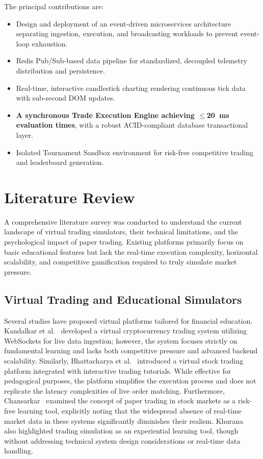 \documentclass[conference]{IEEEtran}
\begin{document}
The principal contributions are:
\begin{itemize}
    \item Design and deployment of an event-driven microservices architecture separating ingestion, execution, and broadcasting workloads to prevent event-loop exhaustion.
    \item Redis Pub/Sub-based data pipeline for standardized, decoupled telemetry distribution and persistence.
    \item Real-time, interactive candlestick charting rendering continuous tick data with sub-second DOM updates.
    \item \textbf{A synchronous Trade Execution Engine achieving $\leq$20~ms evaluation times}, with a robust ACID-compliant database transactional layer.
    \item Isolated Tournament Sandbox environment for risk-free competitive trading and leaderboard generation.
\end{itemize}

\section{Literature Review}

A comprehensive literature survey was conducted to understand the current landscape of virtual trading simulators, their technical limitations, and the psychological impact of paper trading. Existing platforms primarily focus on basic educational features but lack the real-time execution complexity, horizontal scalability, and competitive gamification required to truly simulate market pressure.

\subsection{Virtual Trading and Educational Simulators}
Several studies have proposed virtual platforms tailored for financial education. Kandalkar et al.~\cite{kandalkar2023} developed a virtual cryptocurrency trading system utilizing WebSockets for live data ingestion; however, the system focuses strictly on fundamental learning and lacks both competitive pressure and advanced backend scalability. Similarly, Bhattacharya et al.~\cite{bhattacharya2023} introduced a virtual stock trading platform integrated with interactive trading tutorials. While effective for pedagogical purposes, the platform simplifies the execution process and does not replicate the latency complexities of live order matching. Furthermore, Chansarkar~\cite{chansarkar2022} examined the concept of paper trading in stock markets as a risk-free learning tool, explicitly noting that the widespread absence of real-time market data in these systems significantly diminishes their realism. Khurana~\cite{khurana2021} also highlighted trading simulation as an experiential learning tool, though without addressing technical system design considerations or real-time data handling.
\end{document}
